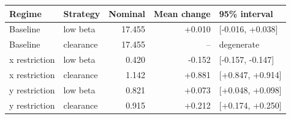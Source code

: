 \begin{tabular}{llrrl}\toprule
Regime & Strategy & Nominal & Mean change & 95\% interval \\\midrule
Baseline & low beta & 17.455 & +0.010 & [-0.016, +0.038] \\
Baseline & clearance & 17.455 & -- & degenerate \\
x restriction & low beta & 0.420 & -0.152 & [-0.157, -0.147] \\
x restriction & clearance & 1.142 & +0.881 & [+0.847, +0.914] \\
y restriction & low beta & 0.821 & +0.073 & [+0.048, +0.098] \\
y restriction & clearance & 0.915 & +0.212 & [+0.174, +0.250] \\
\bottomrule\end{tabular}
